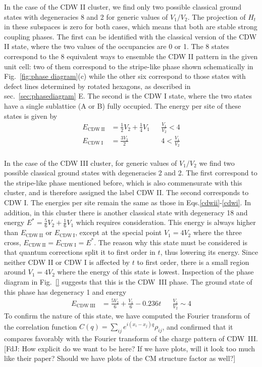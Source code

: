 \documentclass[aps,prx,10pt,twocolumn,floatfix,superscriptaddress,showpacs,numerical,footinbib]{revtex4-1}
\newcommand{\noteFdJ}[1]{{\color{cyan} [FdJ: #1]}}
\begin{document}
In the case of the CDW II cluster, we find only two possible classical ground states with degeneracies 8 and 2 for generic values of $V_1/V_2$. 
% 
The projection of $H_t$ in these subspaces is zero for both cases, which means that both are stable strong coupling phases.
%
The first can be identified with the classical version of the CDW II state, where the two values of the occupancies are 0 or 1.
%
The 8 states correspond to the 8 equivalent ways to ensemble the CDW II pattern in the given unit cell: two of them correspond to the stripe-like phase
shown schematically in Fig.~\ref{fig:phase diagram}(c) while the other six correspond to those states with defect lines determined by rotated hexagons, as described in sec.~\ref{sec:phasediagram} E. 
%
The second is the CDW I state, where the two states have a single sublattice (A or B) fully occupied. The energy per site of these states is given by
%
\begin{align}
E_{\mathrm{CDW~II}} &= \frac{1}{2}V_2 + \frac{1}{4}V_1 & & \tfrac{V_1}{V_2} < 4 \label{cdwii} \\
E_{\mathrm{CDW~I}} &= \frac{3V_2}{2}   & & 4 < \tfrac{V_1}{V_2}\label{cdwi}
\end{align}
\\
%
In the case of the CDW III cluster, for generic values of $V_1/V_2$ we find two possible classical ground states with degeneracies 2 and 2. 
%
The first correspond to the stripe-like phase mentioned before, which is also commensurate with this cluster, and is therefore assigned the label CDW II. The second corresponds to CDW I. The energies per site remain the same as those in Eqs.\ref{cdwii}-\ref{cdwi}. 
%
In addition, in this cluster there is another classical state with degeneracy 18 and energy $E^*=\frac{5}{6}V_2 + \frac{1}{6}V_1$ which requires consideration.  
%
This energy is always higher than $E_{\mathrm{CDW~II}}$ or $E_{\mathrm{CDW~I}}$, except at the special point $V_1=4V_2$ where the three cross, $E_{\mathrm{CDW~II}}=E_{\mathrm{CDW~I}}=E^*$. 
%
The reason why this state must be considered is that quantum corrections split it to first order in $t$, thus lowering its energy. Since neither CDW II or CDW I is affected by $t$ to first order, there is a small region around $V_1=4V_2$ where the energy of this state is lowest. 
%
Inspection of the phase diagram in Fig.~\ref{} suggests that this is the CDW~III phase. The ground state of this phase has degeneracy 1 and energy
%
\begin{align}
E_{\mathrm{CDW~III}} &= \frac{5V_2}{6} + \frac{V_1}{6} - 0.236t   & & \tfrac{V_1}{V_2} \sim 4 \label{cdwiii}
\end{align}
%
To confirm the nature of this state, we have computed the Fourier transform of the correlation function $C(q) = \sum_{ij} e^{i(x_i-x_j)q} \rho_{ij}$, and confirmed that it compares favorably with the Fourier transform of the charge pattern of CDW~III. \noteFdJ{How explicit do we want to be here? If we have plots, will it look too much like their paper? Should we have plots of the CM structure factor as well?}
\end{document}
